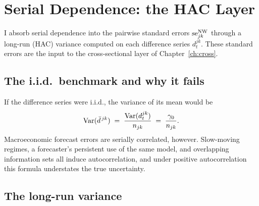 \chapter{Serial Dependence: the HAC Layer}
\label{ch:serial}

I absorb serial dependence into the pairwise standard errors $\mathrm{se}^{\mathrm{NW}}_{jk}$ through a
long-run (HAC) variance computed on each difference series $d^{jk}_t$. These standard
errors are the input to the cross-sectional layer of Chapter~\ref{ch:cross}.

\section{The i.i.d.\ benchmark and why it fails}
\label{sec:iid}

If the difference series were i.i.d., the variance of its mean would be
\begin{equation}
  \operatorname{Var}(\bar{d}^{\,jk}) \;=\; \frac{\operatorname{Var}(d^{jk}_t)}{n_{jk}}
  \;=\; \frac{\gamma_0}{n_{jk}}.
\end{equation}
Macroeconomic forecast errors are serially correlated, however. Slow-moving regimes, a
forecaster's persistent use of the same model, and overlapping information sets all
induce autocorrelation, and under positive autocorrelation this formula understates the
true uncertainty.

\section{The long-run variance}
\label{sec:lrv}

